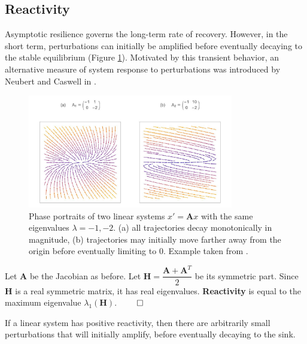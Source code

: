 \subsection{Reactivity}
Asymptotic resilience governs the long-term rate of recovery. However, in the short term, perturbations can initially be amplified before eventually decaying to the stable equilibrium (Figure \ref{fig:reactivity}). Motivated by this transient behavior, an alternative measure of system response to perturbations was introduced by Neubert and Caswell in \cite{neubertAlternativesResilienceMeasuring1997a}.

\begin{figure}[ht]
	\label{fig:reactivity}
	\centering
	\includegraphics[width=0.8\textwidth]{figs/positive_reactivity_real_example}
	\caption{Phase portraits of two linear systems $x' = \textbf{A}x$ with the same eigenvalues  $\lambda = -1, -2$. (a) all trajectories decay monotonically in magnitude, (b) trajectories may initially move farther away from the origin before eventually limiting to 0. Example taken from \cite{neubertAlternativesResilienceMeasuring1997a}.}
\end{figure} 

\begin{definition}
	Let $\textbf{A}$ be the Jacobian as before. Let $\textbf{H} = \dfrac{\textbf{A}+\textbf{A}^T}{2}$ be its symmetric part. Since $\textbf{H}$ is a real symmetric matrix, it has real eigenvalues. \textbf{Reactivity} is equal to the maximum eigenvalue $\lambda_1(\textbf{H})$.  
	\(\qed\)
\end{definition}

If a linear system has positive reactivity, then there are arbitrarily small perturbations that will initially amplify, before eventually decaying to the sink. 